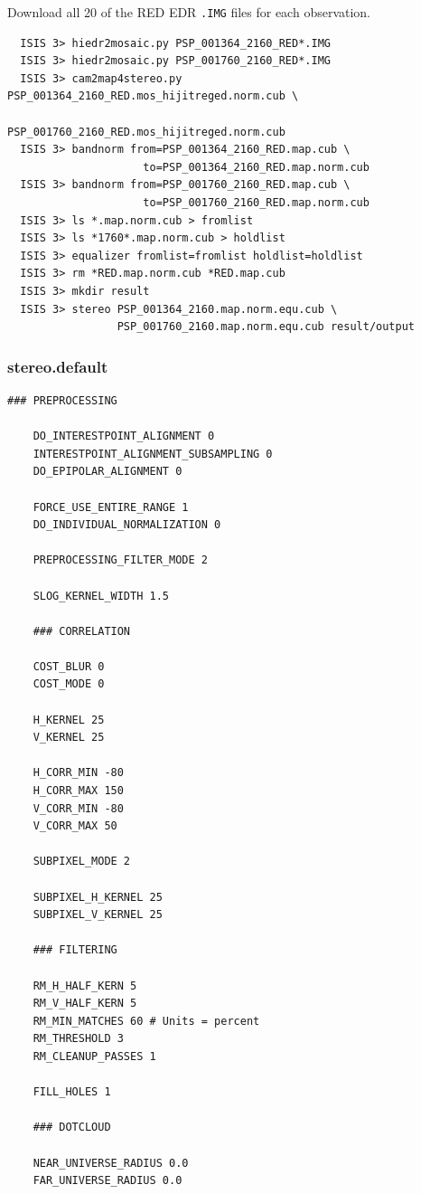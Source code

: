 Download all 20 of the RED EDR \texttt{.IMG} files for each observation.
\begin{verbatim}
  ISIS 3> hiedr2mosaic.py PSP_001364_2160_RED*.IMG
  ISIS 3> hiedr2mosaic.py PSP_001760_2160_RED*.IMG
  ISIS 3> cam2map4stereo.py PSP_001364_2160_RED.mos_hijitreged.norm.cub \
                            PSP_001760_2160_RED.mos_hijitreged.norm.cub
  ISIS 3> bandnorm from=PSP_001364_2160_RED.map.cub \
                     to=PSP_001364_2160_RED.map.norm.cub
  ISIS 3> bandnorm from=PSP_001760_2160_RED.map.cub \
                     to=PSP_001760_2160_RED.map.norm.cub
  ISIS 3> ls *.map.norm.cub > fromlist
  ISIS 3> ls *1760*.map.norm.cub > holdlist
  ISIS 3> equalizer fromlist=fromlist holdlist=holdlist
  ISIS 3> rm *RED.map.norm.cub *RED.map.cub
  ISIS 3> mkdir result
  ISIS 3> stereo PSP_001364_2160.map.norm.equ.cub \
                 PSP_001760_2160.map.norm.equ.cub result/output
\end{verbatim}

\subsubsection*{stereo.default}

\begin{center}\begin{minipage}{5.5in}
\begin{Verbatim}[frame=single,fontsize=\small,label=stereo.default for HiRISE East Mareotis Tholus]
    ### PREPROCESSING

    DO_INTERESTPOINT_ALIGNMENT 0
    INTERESTPOINT_ALIGNMENT_SUBSAMPLING 0
    DO_EPIPOLAR_ALIGNMENT 0

    FORCE_USE_ENTIRE_RANGE 1
    DO_INDIVIDUAL_NORMALIZATION 0

    PREPROCESSING_FILTER_MODE 2

    SLOG_KERNEL_WIDTH 1.5

    ### CORRELATION

    COST_BLUR 0
    COST_MODE 0

    H_KERNEL 25
    V_KERNEL 25

    H_CORR_MIN -80
    H_CORR_MAX 150
    V_CORR_MIN -80
    V_CORR_MAX 50

    SUBPIXEL_MODE 2

    SUBPIXEL_H_KERNEL 25
    SUBPIXEL_V_KERNEL 25

    ### FILTERING

    RM_H_HALF_KERN 5
    RM_V_HALF_KERN 5
    RM_MIN_MATCHES 60 # Units = percent
    RM_THRESHOLD 3
    RM_CLEANUP_PASSES 1

    FILL_HOLES 1

    ### DOTCLOUD

    NEAR_UNIVERSE_RADIUS 0.0
    FAR_UNIVERSE_RADIUS 0.0
\end{Verbatim}
\end{minipage}\end{center}


